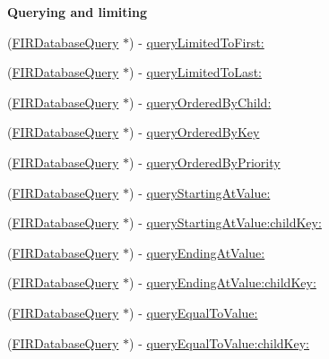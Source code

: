 \begin{Indent}{\bf Querying and limiting}\par
\begin{DoxyCompactItemize}
\item 
(\hyperlink{interface_f_i_r_database_query}{F\+I\+R\+Database\+Query} $\ast$) -\/ \hyperlink{interface_f_i_r_database_reference_a077454c877bb9474303a3b6ef82334fe}{query\+Limited\+To\+First\+:}
\item 
(\hyperlink{interface_f_i_r_database_query}{F\+I\+R\+Database\+Query} $\ast$) -\/ \hyperlink{interface_f_i_r_database_reference_a88c088c33be888a2e1ffe1714525307a}{query\+Limited\+To\+Last\+:}
\item 
(\hyperlink{interface_f_i_r_database_query}{F\+I\+R\+Database\+Query} $\ast$) -\/ \hyperlink{interface_f_i_r_database_reference_a784fc0edfe5f69db8fd44702507e1cc7}{query\+Ordered\+By\+Child\+:}
\item 
(\hyperlink{interface_f_i_r_database_query}{F\+I\+R\+Database\+Query} $\ast$) -\/ \hyperlink{interface_f_i_r_database_reference_a2c537bb6dbc613244d334730e7deb567}{query\+Ordered\+By\+Key}
\item 
(\hyperlink{interface_f_i_r_database_query}{F\+I\+R\+Database\+Query} $\ast$) -\/ \hyperlink{interface_f_i_r_database_reference_a61c7edfbdabbc143666bcbf8daf98baa}{query\+Ordered\+By\+Priority}
\item 
(\hyperlink{interface_f_i_r_database_query}{F\+I\+R\+Database\+Query} $\ast$) -\/ \hyperlink{interface_f_i_r_database_reference_a10944a1346139c99947c32b247d492d6}{query\+Starting\+At\+Value\+:}
\item 
(\hyperlink{interface_f_i_r_database_query}{F\+I\+R\+Database\+Query} $\ast$) -\/ \hyperlink{interface_f_i_r_database_reference_a5110d4aa70fc6ac0ff6ec385c398116c}{query\+Starting\+At\+Value\+:child\+Key\+:}
\item 
(\hyperlink{interface_f_i_r_database_query}{F\+I\+R\+Database\+Query} $\ast$) -\/ \hyperlink{interface_f_i_r_database_reference_ae20021c3e54928fa5ec302d16f74bb7a}{query\+Ending\+At\+Value\+:}
\item 
(\hyperlink{interface_f_i_r_database_query}{F\+I\+R\+Database\+Query} $\ast$) -\/ \hyperlink{interface_f_i_r_database_reference_a064e3322b6073d18338e2fa4647bd772}{query\+Ending\+At\+Value\+:child\+Key\+:}
\item 
(\hyperlink{interface_f_i_r_database_query}{F\+I\+R\+Database\+Query} $\ast$) -\/ \hyperlink{interface_f_i_r_database_reference_ac6d6868c5e8f789630f57c02055ef160}{query\+Equal\+To\+Value\+:}
\item 
(\hyperlink{interface_f_i_r_database_query}{F\+I\+R\+Database\+Query} $\ast$) -\/ \hyperlink{interface_f_i_r_database_reference_a7712559d840ce7c37c35daa185941ea6}{query\+Equal\+To\+Value\+:child\+Key\+:}
\end{DoxyCompactItemize}
\end{Indent}
